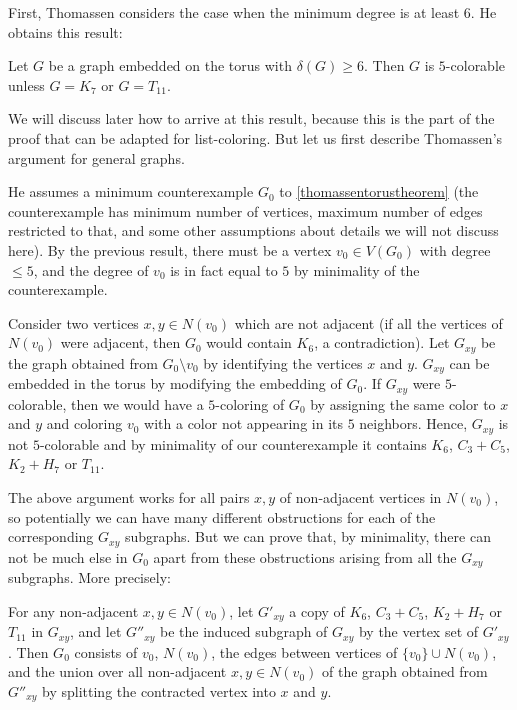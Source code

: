 First, Thomassen considers the case when the minimum degree is at least $6$. 
He obtains this result:

\begin{theorem}
Let $G$ be a graph embedded on the torus with $\delta(G) \geq 6$. Then $G$ is $5$-colorable 
unless $G = K_7$ or $G = T_{11}$.
\end{theorem}

We will discuss later how to arrive at this result, because this is the part of the proof that 
can be adapted for list-coloring. But let us first describe Thomassen's argument for 
general graphs.

He assumes a minimum counterexample $G_0$ to \ref{thomassentorustheorem} (the counterexample has
minimum number of vertices, maximum number of edges restricted to that, and some other assumptions 
about details we will not discuss here). By the previous result, 
there must be a vertex $v_0 \in V(G_0)$ with degree $\leq 5$, and the degree of $v_0$ is in 
fact equal to $5$ by minimality of the counterexample. 

Consider two vertices $x, y \in N(v_0)$ which are not adjacent (if all the vertices of 
$N(v_0)$ were adjacent, then $G_0$ would contain $K_6$, a contradiction). Let $G_{xy}$ be 
the graph obtained from $G_0 \setminus v_0$ by identifying the vertices $x$ and $y$. 
$G_{xy}$ can be embedded in the torus by modifying the embedding of $G_0$. If $G_{xy}$ 
were $5$-colorable, then we would have a $5$-coloring of $G_0$ by assigning the same color 
to $x$ and $y$ and coloring $v_0$ with a color not appearing in its $5$ neighbors. 
Hence, $G_{xy}$ is not $5$-colorable and by minimality of our counterexample it 
contains $K_6$, $C_3 + C_5$, $K_2 + H_7$ or $T_{11}$.

The above argument works for all pairs $x, y$ of non-adjacent vertices in $N(v_0)$, so potentially 
we can have many different obstructions for each of the corresponding $G_{xy}$ subgraphs. 
But we can prove that, by minimality, there can not be much else in $G_0$ apart from these
obstructions arising from all the $G_{xy}$ subgraphs. More precisely:  

\begin{proposition}
	\label{g0proposition}
	For any non-adjacent $x, y \in N(v_0)$, let $G'_{xy}$ a copy of 
	$K_6$, $C_3 + C_5$, $K_2 + H_7$ or $T_{11}$ in $G_{xy}$, and let $G''_{xy}$ be the induced
	subgraph of $G_{xy}$ by the vertex set of $G'_{xy}$. Then $G_0$ consists of $v_0$, $N(v_0)$, 
	the edges between vertices of $\{v_0\} \cup N(v_0)$, and the union over all non-adjacent 
	$x, y \in N(v_0)$ of the graph obtained from $G''_{xy}$ by splitting the contracted vertex
	into $x$ and $y$.  
\end{proposition}

